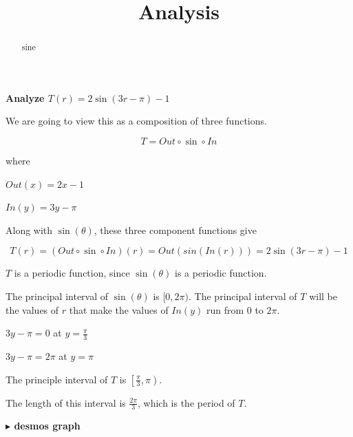 \documentclass{ximera}
\title{Analysis}
\begin{document}
\begin{abstract}
sine
\end{abstract}
\maketitle












\textbf{\textcolor{purple!85!blue}{Analyze  $T(r) =  2 \sin(3r - \pi) - 1$}}



\begin{template}


We are going to view this as a composition of three functions.


\[
T = Out \circ \sin \circ In
\]


where


$Out(x) = 2x - 1$ 


$In(y) = 3y - \pi$ 




Along with $\sin(\theta)$, these three component functions give



\[
T(r) = (Out \circ \sin \circ In)(r) = Out(sin(In(r)))  = 2 \sin(3r - \pi) - 1
\]




\end{template}

$T$ is a periodic function, since $\sin(\theta)$ is a periodic function. 

The principal interval of $\sin(\theta)$ is $[0, 2\pi)$.  The principal interval of $T$ will be the values of $r$ that make the values of $In(y)$ run from $0$ to $2\pi$. 


$3y - \pi = 0$ at $y = \frac{\pi}{3}$

$3y - \pi = 2\pi$ at $y = \pi$

The principle interval of $T$ is $\left[ \frac{\pi}{3}, \pi \right)$. 

The length of this interval is $\frac{2\pi}{3}$, which is the period of $T$. 









\textbf{\textcolor{blue!55!black}{$\blacktriangleright$ desmos graph}} 
\begin{center}
\end{center}
\end{document}
